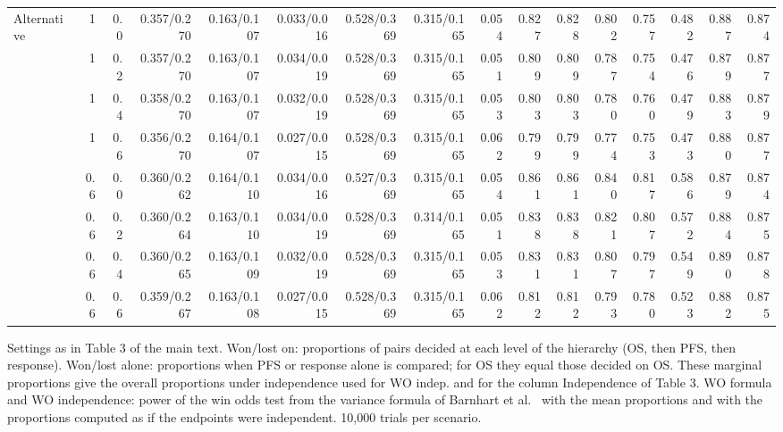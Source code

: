 \begin{table}[htbp]
\begin{threeparttable}
\begin{tabular}{lrrrrrrrrrrrrrrr}
\midrule
Alternative & 1 & 0.0 & 0.357/0.270 & 0.163/0.107 & 0.033/0.016 & 0.528/0.369 & 0.315/0.165 & 0.054 & 0.827 & 0.828 & 0.802 & 0.757 & 0.482 & 0.887 & 0.874 \\
 & 1 & 0.2 & 0.357/0.270 & 0.163/0.107 & 0.034/0.019 & 0.528/0.369 & 0.315/0.165 & 0.051 & 0.809 & 0.809 & 0.787 & 0.754 & 0.476 & 0.879 & 0.877 \\
 & 1 & 0.4 & 0.358/0.270 & 0.163/0.107 & 0.032/0.019 & 0.528/0.369 & 0.315/0.165 & 0.053 & 0.803 & 0.803 & 0.780 & 0.760 & 0.479 & 0.883 & 0.879 \\
 & 1 & 0.6 & 0.356/0.270 & 0.164/0.107 & 0.027/0.015 & 0.528/0.369 & 0.315/0.165 & 0.062 & 0.799 & 0.799 & 0.774 & 0.753 & 0.473 & 0.880 & 0.877 \\
 & 0.6 & 0.0 & 0.360/0.262 & 0.164/0.110 & 0.034/0.016 & 0.527/0.369 & 0.315/0.165 & 0.054 & 0.861 & 0.861 & 0.840 & 0.817 & 0.586 & 0.879 & 0.874 \\
 & 0.6 & 0.2 & 0.360/0.264 & 0.163/0.110 & 0.034/0.019 & 0.528/0.369 & 0.314/0.165 & 0.051 & 0.838 & 0.838 & 0.821 & 0.807 & 0.572 & 0.884 & 0.875 \\
 & 0.6 & 0.4 & 0.360/0.265 & 0.163/0.109 & 0.032/0.019 & 0.528/0.369 & 0.315/0.165 & 0.053 & 0.831 & 0.831 & 0.807 & 0.797 & 0.549 & 0.890 & 0.878 \\
 & 0.6 & 0.6 & 0.359/0.267 & 0.163/0.108 & 0.027/0.015 & 0.528/0.369 & 0.315/0.165 & 0.062 & 0.812 & 0.812 & 0.793 & 0.780 & 0.523 & 0.882 & 0.875 \\
\bottomrule
\end{tabular}
\begin{tablenotes}
\footnotesize
\item Settings as in Table 3 of the main text. Won/lost on: proportions of pairs decided at each level of the hierarchy (OS, then PFS, then response). Won/lost alone: proportions when PFS or response alone is compared; for OS they equal those decided on OS. These marginal proportions give the overall proportions under independence used for WO indep. and for the column Independence of Table 3. WO formula and WO independence: power of the win odds test from the variance formula of Barnhart et al.~\cite{Barnhart2025} with the mean proportions and with the proportions computed as if the endpoints were independent. 10,000 trials per scenario.
\end{tablenotes}
\end{threeparttable}
\end{table}
